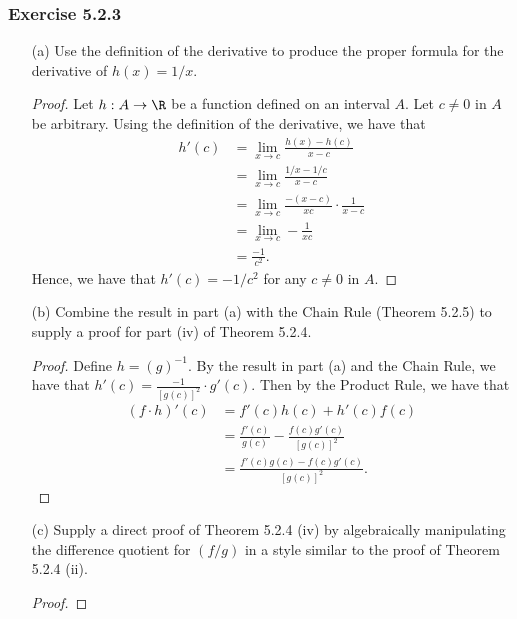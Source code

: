 \subsubsection{Exercise 5.2.3} 
\begin{enumerate}
    \item[(a)] Use the definition of the derivative to produce the proper formula for the derivative of \( h(x) = 1 / x  \).
        \begin{proof}
        Let \( h: A \to \R  \) be a function defined on an interval \( A  \). Let \( c \neq 0   \) in \( A  \) be arbitrary. Using the definition of the derivative, we have that 
        \begin{align*}
            h'(c) &= \lim_{ x \to c  } \frac{ h(x) - h(c)  }{ x - c  }  \\
                  &= \lim_{ x \to c  } \frac{ 1 /x  - 1/c }{ x -c   } \\
                  &= \lim_{ x \to c  } \frac{  -(x - c)  }{ xc  } \cdot \frac{ 1 }{ x - c  } \\
                  &= \lim_{ x \to c  } -\frac{ 1 }{ xc } \\
                  &= \frac{ -1 }{ c^2 }.
        \end{align*}
        Hence, we have that \( h'(c) = -1/c^2 \) for any \( c \neq 0  \) in \( A  \).
        \end{proof}
    \item[(b)] Combine the result in part (a) with the Chain Rule (Theorem 5.2.5) to supply a proof for part (iv) of Theorem 5.2.4.
        \begin{proof}
            Define \( h = (g)^{-1}  \). By the result in part (a) and the Chain Rule, we have that \( h'(c) = \frac{ -1 }{ [g(c)]^2 } \cdot g'(c)   \). Then by the Product Rule, we have that 
            \begin{align*}
                (f \cdot h)'(c) &= f'(c)h(c) + h'(c)f(c) \\
                                &= \frac{ f'(c)  }{ g(c)  } - \frac{ f(c) g'(c)  }{ [g(c)]^2 } \\ 
                                &= \frac{ f'(c) g(c) - f(c)g'(c)  }{ [g(c)]^2 }. 
            \end{align*}
        \end{proof}
        \item[(c)] Supply a direct proof of Theorem 5.2.4 (iv) by algebraically manipulating the difference quotient for \( (f/g)  \) in a style similar to the proof of Theorem 5.2.4 (ii).
            \begin{proof}

\end{proof}
\end{enumerate}
